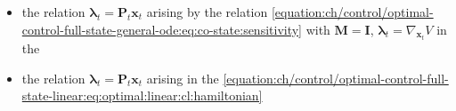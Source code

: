 \documentclass[letterpaper,10pt,english]{jupyterBook}
\begin{document}
\begin{itemize}
\item {} 
\sphinxAtStartPar
the relation \(\boldsymbol\lambda_t = \mathbf{P}_t \mathbf{x}_t\) arising by the relation \eqref{equation:ch/control/optimal-control-full-state-general-ode:eq:co-state:sensitivity} with \(\mathbf{M} = \mathbf{I}\), \(\boldsymbol \lambda_t = \nabla_{\mathbf{x}_t} V\) in the {\hyperref[\detokenize{ch/control/optimal-control-full-state-linear:control-optimal-full-state-fb-linear-dynamic-programming}]{}}

\item {} 
\sphinxAtStartPar
the relation \(\boldsymbol\lambda_t = \mathbf{P}_t \mathbf{x}_t\) arising in the  \eqref{equation:ch/control/optimal-control-full-state-linear:eq:optimal:linear:cl:hamiltonian}

\end{itemize}
\end{document}
